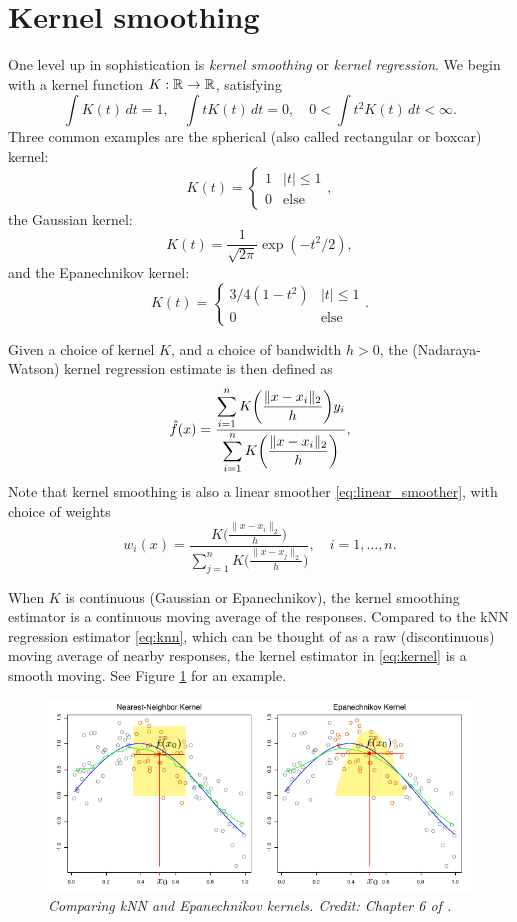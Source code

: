 \documentclass{article}
\begin{document}
\section{Kernel smoothing}

One level up in sophistication is \emph{kernel smoothing} or \emph{kernel 
  regression}. We begin with a kernel function $K : \mathbb{R} \to \mathbb{R}$, satisfying   
\[
\int K(t) \, dt = 1, \quad
\int t K(t) \, dt = 0, \quad
0 < \int t^2 K(t) \, dt < \infty.
\]
Three common examples are the spherical (also called rectangular or boxcar)
kernel: 
\[
K(t) = 
\begin{cases}
1 & |t| \leq 1 \\
0 & \text{else}
\end{cases},
\]
the Gaussian kernel:
\[
K(t) = \frac{1}{\sqrt{2\pi}} \exp(-t^2/2),
\]
and the Epanechnikov kernel:
\[
K(t) = \begin{cases}
3/4 (1-t^2) & |t| \leq 1 \\ 
0 & \text{else}
\end{cases}.
\]

Given a choice of kernel $K$, and a choice of bandwidth $h>0$, the
(Nadaraya-Watson) kernel regression estimate is then defined as
\begin{equation}
\label{eq:kernel}
\hat{f}(x) = 
\frac{\displaystyle \sum_{i=1}^n K\bigg( \frac{\|x-x_i\|_2}{h} \bigg)  y_i}  
{\displaystyle \sum_{i=1}^n K\bigg( \frac{\|x-x_i\|_2}{h} \bigg)}, 
\end{equation}
Note that kernel smoothing is also a linear smoother \eqref{eq:linear_smoother},
with choice of weights  
\[
w_i(x) = 
\frac{\displaystyle K\bigg ( \frac{\|x-x_i\|_2}{h} \bigg)}
{\displaystyle \sum_{j=1}^n K\bigg ( \frac{\|x-x_j\|_2}{h} \bigg)},
\quad i=1,\dots,n. 
\]

When $K$ is continuous (Gaussian or Epanechnikov), the kernel smoothing
estimator is a continuous moving average of the responses. Compared to the kNN
regression estimator \eqref{eq:knn}, which can be thought of as a raw 
(discontinuous) moving average of nearby responses, the kernel estimator in 
\eqref{eq:kernel} is a smooth moving. See Figure \ref{fig:kernel} for an example.

\begin{figure}[tb]
\centering
\includegraphics[width=\textwidth]{kernels.pdf}
\caption{\it Comparing kNN and Epanechnikov kernels. Credit: Chapter 6 of
  \citet{hastie2009elements}.}      
\label{fig:kernel}
\end{figure}
\end{document}
